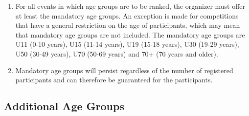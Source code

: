 \begin{enumerate}[leftmargin=1.5em,labelsep=*]
	\item For all events in which age groups are to be ranked, the organizer must offer at least the mandatory age groups.
	An exception is made for competitions that have a general restriction on the age of participants, which may mean that mandatory age groups are not included.
	The mandatory age groups are U11 (0-10 years), U15 (11-14 years), U19 (15-18 years), U30 (19-29 years), U50 (30-49 years), U70 (50-69 years) and 70+ (70 years and older).
	\item Mandatory age groups will persist regardless of the number of registered participants and can therefore be guaranteed for the participants.
\end{enumerate}

\subsection{Additional Age Groups \label{subsec:general_hosts-option-unicon_combining-age-groups}}

